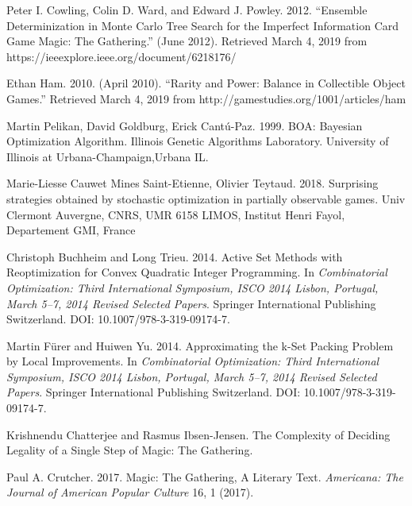 \documentclass[12pt, letterpaper]{article}
\begin{document}
\begin{thebibliography}{9}


Peter I. Cowling, Colin D. Ward, and Edward J. Powley. 2012.
\enquote{Ensemble Determinization in Monte Carlo Tree Search for the Imperfect Information Card Game Magic: The
Gathering.}
(June 2012). Retrieved March 4, 2019 from https://ieeexplore.ieee.org/document/6218176/

Ethan Ham. 2010. (April 2010).
\enquote{Rarity and Power: Balance in Collectible Object Games.}
Retrieved March 4, 2019 from http://gamestudies.org/1001/articles/ham


Martin Pelikan, David Goldburg, Erick Cantú-Paz. 1999. BOA: Bayesian Optimization Algorithm. Illinois Genetic Algorithms
Laboratory. University of Illinois at Urbana-Champaign,Urbana IL.

Marie-Liesse Cauwet Mines Saint-Etienne, Olivier Teytaud. 2018. Surprising strategies obtained by stochastic
optimization in partially observable games. Univ Clermont Auvergne, CNRS, UMR 6158 LIMOS, Institut Henri Fayol,
Departement GMI, France


Christoph Buchheim and Long Trieu. 2014.
Active Set Methods with Reoptimization for Convex Quadratic Integer Programming.
In \textit{Combinatorial Optimization: Third International Symposium,
ISCO 2014 Lisbon, Portugal, March 5–7, 2014 Revised Selected Papers}.
Springer International Publishing Switzerland.
DOI: 10.1007/978-3-319-09174-7.

Martin Fürer and Huiwen Yu. 2014.
Approximating the k-Set Packing Problem by Local Improvements.
In \textit{Combinatorial Optimization: Third International Symposium,
ISCO 2014 Lisbon, Portugal, March 5–7, 2014 Revised Selected Papers}.
Springer International Publishing Switzerland.
DOI: 10.1007/978-3-319-09174-7.


Krishnendu Chatterjee and Rasmus Ibsen-Jensen.
The Complexity of Deciding Legality of a Single Step of Magic: The Gathering.

Paul A. Crutcher. 2017. Magic: The Gathering, A Literary Text.
\textit{Americana: The Journal of American Popular Culture} 16, 1 (2017).

\end{thebibliography}
\end{document}
